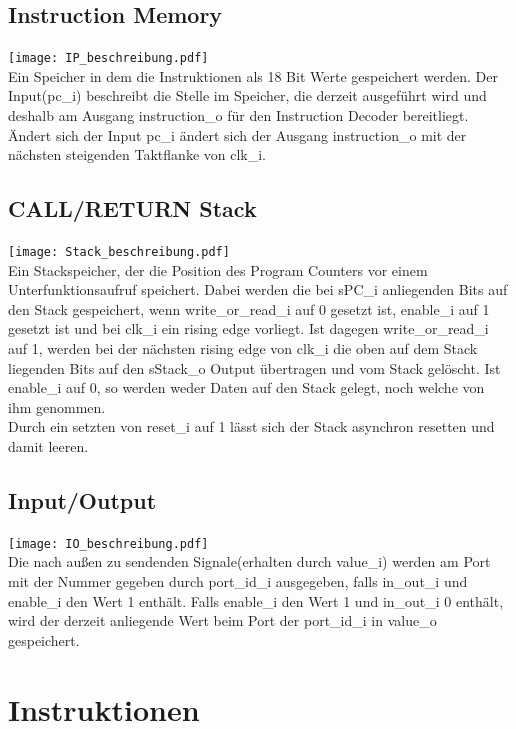 \documentclass{scrartcl}
\begin{document}
\subsection{Instruction Memory}
\texttt{[image: IP\_beschreibung.pdf]}\\
Ein Speicher in dem die Instruktionen als 18 Bit Werte gespeichert werden. Der Input(pc\_i) beschreibt die Stelle im Speicher, die derzeit ausgeführt wird und deshalb am Ausgang instruction\_o für den Instruction Decoder bereitliegt. Ändert sich der Input pc\_i ändert sich der Ausgang instruction\_o mit der nächsten steigenden Taktflanke von clk\_i.
\subsection{CALL/RETURN Stack}
\texttt{[image: Stack\_beschreibung.pdf]}\\
Ein Stackspeicher, der die Position des Program Counters vor einem Unterfunktionsaufruf speichert. Dabei werden die bei sPC\_i anliegenden Bits auf den Stack gespeichert, wenn write\_or\_read\_i auf 0 gesetzt ist, enable\_i auf 1 gesetzt ist und bei clk\_i ein rising edge vorliegt. Ist dagegen write\_or\_read\_i auf 1, werden bei der nächsten rising edge von clk\_i die oben auf dem Stack liegenden Bits auf den sStack\_o Output übertragen und vom Stack gelöscht. Ist enable\_i auf 0, so werden weder Daten auf den Stack gelegt, noch welche von ihm genommen. \\
Durch ein setzten von reset\_i auf 1 lässt sich der Stack asynchron resetten und damit leeren.

\subsection{Input/Output}
\texttt{[image: IO\_beschreibung.pdf]}\\
Die nach außen zu sendenden Signale(erhalten durch value\_i) werden am Port mit der Nummer gegeben durch port\_id\_i ausgegeben, falls in\_out\_i und enable\_i den Wert 1 enthält. Falls enable\_i den Wert 1 und in\_out\_i 0 enthält, wird der derzeit anliegende Wert beim Port der port\_id\_i in value\_o gespeichert.
\newpage
\section{Instruktionen}
\end{document}
